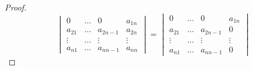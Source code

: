 \documentclass[leqno,autodetect-engine,dvipdfmx-if-dvi,ja=standard,a4paper,12pt]{bxjsbook}
\begin{document}
\begin{proof}
						\begin{equation}
							\begin{vmatrix}
								0 &   \dots & 0 & a_{1 n} \\
								a_{2 1} & \dots & a_{2 n-1} & a_{2 n} \\
								\vdots & \dots & \vdots & \vdots \\
								a_{n 1} & \dots & a_{n n-1}  & a_{n n}
							\end{vmatrix}
							= \begin{vmatrix}
								0 &   \dots & 0 & a_{1 n} \\
								a_{2 1} & \dots & a_{2 n-1} & 0 \\
								\vdots & \dots & \vdots & \vdots \\
								a_{n 1} & \dots & a_{n n-1}  & 0
							\end{vmatrix}
						\end{equation}
					\end{proof}
\end{document}
